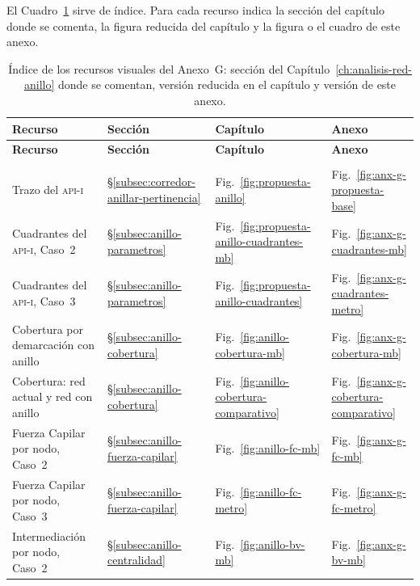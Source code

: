 El Cuadro~\ref{tab:anx-g-indice} sirve de índice. Para cada recurso indica la
sección del capítulo donde se comenta, la figura reducida del capítulo y la
figura o el cuadro de este anexo.

\begin{longtable}{@{}p{6.2cm}lll@{}}
    \caption[Índice de recursos visuales del Anexo~G]{%
    Índice de los recursos visuales del Anexo~G: sección del
    Capítulo~\ref{ch:analisis-red-anillo} donde se comentan, versión
    reducida en el capítulo y versión de este anexo.}
    \label{tab:anx-g-indice} \\
    \toprule
    \textbf{Recurso} & \textbf{Sección} & \textbf{Capítulo} & \textbf{Anexo} \\
    \midrule
    \endfirsthead
    \toprule
    \textbf{Recurso} & \textbf{Sección} & \textbf{Capítulo} & \textbf{Anexo} \\
    \midrule
    \endhead
    \bottomrule
    \endfoot
    \multicolumn{4}{@{}l}{\textit{Cartografía \textbf{QGIS}}} \\
    Trazo del \textsc{api-i} & §\ref{subsec:corredor-anillar-pertinencia} & Fig.~\ref{fig:propuesta-anillo} & Fig.~\ref{fig:anx-g-propuesta-base} \\
    Cuadrantes del \textsc{api-i}, Caso~2 & §\ref{subsec:anillo-parametros} & Fig.~\ref{fig:propuesta-anillo-cuadrantes-mb} & Fig.~\ref{fig:anx-g-cuadrantes-mb} \\
    Cuadrantes del \textsc{api-i}, Caso~3 & §\ref{subsec:anillo-parametros} & Fig.~\ref{fig:propuesta-anillo-cuadrantes} & Fig.~\ref{fig:anx-g-cuadrantes-metro} \\
    Cobertura por demarcación con anillo & §\ref{subsec:anillo-cobertura} & Fig.~\ref{fig:anillo-cobertura-mb} & Fig.~\ref{fig:anx-g-cobertura-mb} \\
    Cobertura: red actual y red con anillo & §\ref{subsec:anillo-cobertura} & Fig.~\ref{fig:anillo-cobertura-comparativo} & Fig.~\ref{fig:anx-g-cobertura-comparativo} \\
    Fuerza Capilar por nodo, Caso~2 & §\ref{subsec:anillo-fuerza-capilar} & Fig.~\ref{fig:anillo-fc-mb} & Fig.~\ref{fig:anx-g-fc-mb} \\
    Fuerza Capilar por nodo, Caso~3 & §\ref{subsec:anillo-fuerza-capilar} & Fig.~\ref{fig:anillo-fc-metro} & Fig.~\ref{fig:anx-g-fc-metro} \\
    Intermediación por nodo, Caso~2 & §\ref{subsec:anillo-centralidad} & Fig.~\ref{fig:anillo-bv-mb} & Fig.~\ref{fig:anx-g-bv-mb} \\

\end{longtable}
